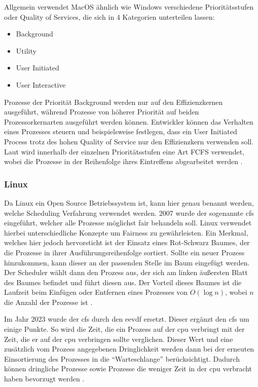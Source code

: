Allgemein verwendet MacOS ähnlich wie Windows verschiedene Prioritätsstufen oder Quality of Services, die sich in 4 Kategorien unterteilen lassen:
\begin{multicols}{2}
    \begin{itemize}[noitemsep]
        \item Background
        \item Utility
        \item User Initiated
        \item User Interactive
    \end{itemize}
\end{multicols}
Prozesse der Priorität Background werden nur auf den Effizienzkernen ausgeführt, während Prozesse von höherer Priorität auf beiden Prozessorkernarten ausgeführt werden können.
Entwickler können das Verhalten eines Prozesses steuern und beispielsweise festlegen, dass ein User Initiated Process trotz des hohen Quality of Service nur den Effizienzkern verwenden soll.
Laut  wird innerhalb der einzelnen Prioritätsstufen eine Art \ac{FCFS} verwendet, wobei die Prozesse in der Reihenfolge ihres Eintreffens abgearbeitet werden \autocite{hoakley.2022b}.

\subsubsection{Linux}
Da Linux ein Open Source Betriebssystem ist, kann hier genau benannt werden, welche Scheduling Verfahrung verwendet werden. 2007 wurde der sogenannte \ac{cfs} eingeführt, welcher alle Prozesse möglichst fair behandeln soll.
Linux verwendet hierbei unterschiedliche Konzepte um Fairness zu gewährleisten.
Ein Merkmal, welches hier jedoch hervorsticht ist der Einsatz eines Rot-Schwarz Baumes, der die Prozesse in ihrer Ausführungsreihenfolge sortiert.
Sollte ein neuer Prozess hinzukommen, kann dieser an der passenden Stelle im Baum eingefügt werden.
Der Scheduler wählt dann den Prozess aus, der sich am linken äußersten Blatt des Baumes befindet und führt diesen aus.
Der Vorteil dieses Baumes ist die Laufzeit beim Einfügen oder Entfernen eines Prozesses von $O(\log n)$, wobei $n$ die Anzahl der Prozesse ist \autocite{Jones.2009}.

Im Jahr 2023 wurde der \ac{cfs} durch den \ac{eevdf} ersetzt. Dieser ergänzt den \ac{cfs} um einige Punkte.
So wird die Zeit, die ein Prozess auf der \ac{cpu} verbringt mit der Zeit, die er auf der \ac{cpu} verbringen sollte verglichen. Dieser Wert und eine zusätzlich vom Prozess angegebenen Dringlichkeit werden dann bei der erneuten Einsortierung des Prozesses in die \enquote{Warteschlange} berücksichtigt.
Dadurch können dringliche Prozesse sowie Prozesse die weniger Zeit in der \ac{cpu} verbracht haben bevorzugt werden \autocite{Muller.01112023}. 


